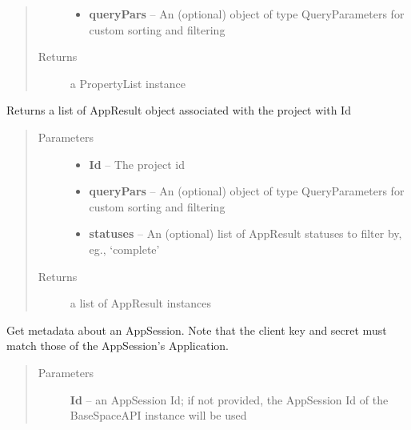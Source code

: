 \documentclass[letterpaper,10pt,english]{sphinxmanual}
\begin{document}
\begin{fulllineitems}
\begin{fulllineitems}
\begin{quote}
\begin{description}
\begin{itemize}
\item {} 
\textbf{queryPars} -- An (optional) object of type QueryParameters for custom sorting and filtering

\end{itemize}

\item[{Returns}] \leavevmode
a PropertyList instance

\end{description}\end{quote}

\end{fulllineitems}


\begin{fulllineitems}
\label{Available modules:BaseSpacePy.api.BaseSpaceAPI.BaseSpaceAPI.getAppResultsByProject}
Returns a list of AppResult object associated with the project with Id
\begin{quote}\begin{description}
\item[{Parameters}] \leavevmode\begin{itemize}
\item {} 
\textbf{Id} -- The project id

\item {} 
\textbf{queryPars} -- An (optional) object of type QueryParameters for custom sorting and filtering

\item {} 
\textbf{statuses} -- An (optional) list of AppResult statuses to filter by, eg., `complete'

\end{itemize}

\item[{Returns}] \leavevmode
a list of AppResult instances

\end{description}\end{quote}

\end{fulllineitems}


\begin{fulllineitems}
\label{Available modules:BaseSpacePy.api.BaseSpaceAPI.BaseSpaceAPI.getAppSession}
Get metadata about an AppSession.         
Note that the client key and secret must match those of the AppSession's Application.
\begin{quote}\begin{description}
\item[{Parameters}] \leavevmode
\textbf{Id} -- an AppSession Id; if not provided, the AppSession Id of the BaseSpaceAPI instance will be used


\end{description}
\end{quote}
\end{fulllineitems}
\end{fulllineitems}
\end{document}
